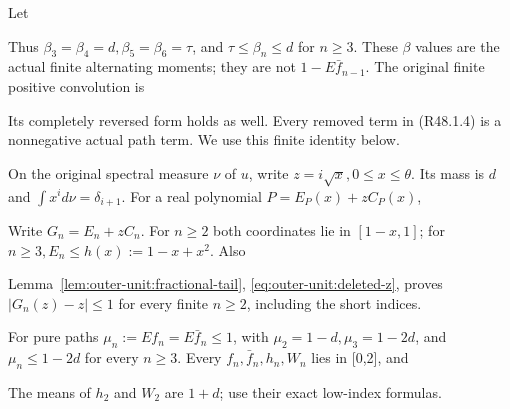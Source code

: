 Let


Thus \(\beta_{3} = \beta_{4} = d,\allowbreak \allowbreak  \beta_{5} = \beta_{6} = \tau\), and \(\tau \le  \beta_n \le  d\) for \(n \ge  3\). These \(\beta\) values are the actual finite alternating moments; they are not \(1 - E \bar f_{n-1}\). The original finite positive convolution is


Its completely reversed form holds as well. Every removed term in (R48.1.4) is a nonnegative actual path term. We use this finite identity below.

On the original spectral measure \(\nu\) of \(u\), write \(z = i \sqrt{x},\allowbreak \allowbreak  0 \le  x \le  \theta\). Its mass is \(d\) and \(\int  x^i d\nu = \delta_{i+1}\). For a real polynomial \(P = E_P(x) + z C_P(x)\),


Write \(G_n = E_n + z C_n\). For \(n \ge  2\) both coordinates lie in \([1-x,\allowbreak \allowbreak 1]\); for \(n \ge  3,\allowbreak \allowbreak  E_n \le  h(x) := 1-x+x^2\). Also


 Lemma~\ref{lem:outer-unit:fractional-tail},
\eqref{eq:outer-unit:deleted-z}, proves \(\lvert G_n(z)-z\rvert\le1\)
for every finite \(n\ge2\), including the short indices.

For pure paths \(\mu_n := E f_n = E \bar f_n \le  1\), with \(\mu_{2} = 1-d,\allowbreak \allowbreak  \mu_{3} = 1-2d\), and \(\mu_n \le  1-2d\) for every \(n \ge  3\). Every \(f_n,\allowbreak \allowbreak \bar f_n,\allowbreak \allowbreak h_n,\allowbreak \allowbreak W_n\) lies in [0,2], and


The means of \(h_{2}\) and \(W_{2}\) are \(1+d\); use their exact low-index formulas.


